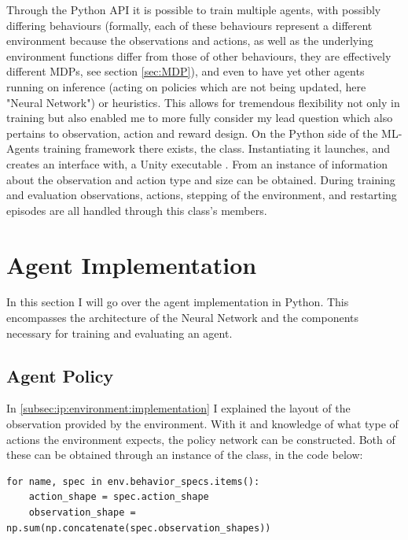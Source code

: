 \noindent
Through the Python API it is possible to train multiple agents, with possibly differing behaviours (formally, each of these behaviours represent a different environment because the observations and actions, as well as the underlying environment functions differ from those of other behaviours, they are effectively different MDPs, see section \ref{sec:MDP}), and even to have yet other agents running on inference (acting on policies which are not being updated, here "Neural Network") or heuristics. This allows for tremendous flexibility not only in training but also enabled me to more fully consider my lead question which also pertains to observation, action and reward design. On the Python side of the ML-Agents training framework there exists, the  class. Instantiating it launches, and creates an interface with, a Unity executable \cite[p. 13]{juliani2020unity}. From an instance of  information about the observation and action type and size can be obtained. During training and evaluation observations, actions, stepping of the environment, and restarting episodes are all handled through this class's members.

\section{Agent Implementation}\label{sec:ip:agent_implementation}
In this section I will go over the agent implementation in Python. This encompasses the architecture of the Neural Network and the components necessary for training and evaluating an agent.

\subsection{Agent Policy}\label{subsec:ip:agent:network}
In \ref{subsec:ip:environment:implementation} I explained the layout of the observation provided by the environment. With it and knowledge of what type of actions the environment expects, the policy network can be constructed. Both of these can be obtained through an instance of the  class,  in the code below:

\begin{lstlisting}[basicstyle=\footnotesize]
for name, spec in env.behavior_specs.items():
    action_shape = spec.action_shape
    observation_shape = np.sum(np.concatenate(spec.observation_shapes))
\end{lstlisting}

